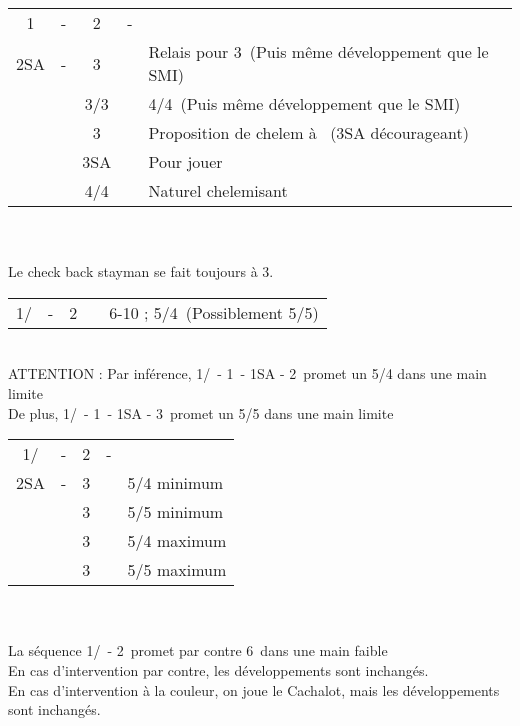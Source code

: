 \documentclass[a4paper, oneside, 11pt]{report}
\begin{document}
		\begin{tabular}{cccc|l}
		1\carreau & - & 2\trefle & - &\\
		2SA & - & 3\trefle && Relais pour 3\carreau\ (Puis même développement que le SMI)\\
		&& 3\carreau/3\coeur && 4\coeur/4\pique\ (Puis même développement que le SMI)\\
		&& 3\pique && Proposition de chelem à \trefle\ (3SA décourageant)\\
		&& 3SA && Pour jouer\\
		&& 4\trefle/4\carreau && Naturel chelemisant\\
		\end{tabular}\\\\

		Le check back stayman se fait toujours à 3\trefle.\\

		\begin{tabular}{cccc|l}
		1\trefle/\carreau & - & 2\coeur && 6-10 ; 5\pique/4\coeur\ (Possiblement 5/5)\\
		\end{tabular}\\
		ATTENTION : Par inférence, 1\trefle/\carreau\ - 1\pique\ - 1SA - 2\coeur\ promet un 5/4 dans une main limite\\
		De plus, 1\trefle/\carreau\ - 1\pique\ - 1SA - 3\coeur\ promet un 5/5 dans une main limite\\
	
		\begin{tabular}{cccc|l}
		1\trefle/\carreau & - & 2\coeur & - &\\
		2SA & - & 3\trefle && 5/4 minimum\\
		&& 3\carreau && 5/5 minimum\\
		&& 3\coeur && 5/4 maximum\\
		&& 3\pique && 5/5 maximum\\
		\end{tabular}\\\\
	
		La séquence 1\trefle/\carreau\ - 2\pique\ promet par contre 6\pique\ dans une main faible\\
		
		En cas d'intervention par contre, les développements sont inchangés.\\
		En cas d'intervention à la couleur, on joue le Cachalot, mais les développements sont inchangés.\\
	
\end{document}
